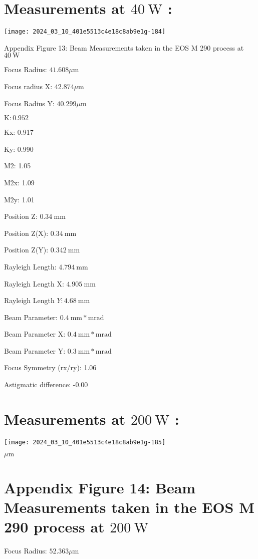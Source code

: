 \documentclass[10pt]{article}
\begin{document}
\section*{Measurements at $40 \mathrm{~W}$ :}
\begin{center}
\texttt{[image: 2024\_03\_10\_401e5513c4e18c8ab9e1g-184]}
\end{center}

Appendix Figure 13: Beam Measurements taken in the EOS M 290 process at $40 \mathrm{~W}$

Focus Radius: $41.608 \mu \mathrm{m}$

Focus radius X: $42.874 \mu \mathrm{m}$

Focus Radius Y: $40.299 \mu \mathrm{m}$

$\mathrm{K}: 0.952$

Kx: 0.917

Ky: 0.990

M2: 1.05

M2x: 1.09

M2y: 1.01

Position Z: $0.34 \mathrm{~mm}$

Position Z(X): $0.34 \mathrm{~mm}$

Position Z(Y): $0.342 \mathrm{~mm}$

Rayleigh Length: $4.794 \mathrm{~mm}$

Rayleigh Length X: $4.905 \mathrm{~mm}$

Rayleigh Length $Y: 4.68 \mathrm{~mm}$

Beam Parameter: $0.4 \mathrm{~mm} * \mathrm{mrad}$

Beam Parameter X: $0.4 \mathrm{~mm} * \mathrm{mrad}$

Beam Parameter Y: $0.3 \mathrm{~mm} * \mathrm{mrad}$

Focus Symmetry (rx/ry): 1.06

Astigmatic difference: -0.00

\section*{Measurements at $200 \mathrm{~W}$ :}
\begin{center}
\texttt{[image: 2024\_03\_10\_401e5513c4e18c8ab9e1g-185]}
\end{center}

$\mu \mathrm{m}$

\section*{Appendix Figure 14: Beam Measurements taken in the EOS M 290 process at $200 \mathrm{~W}$}
Focus Radius: $52.363 \mu \mathrm{m}$
\end{document}
